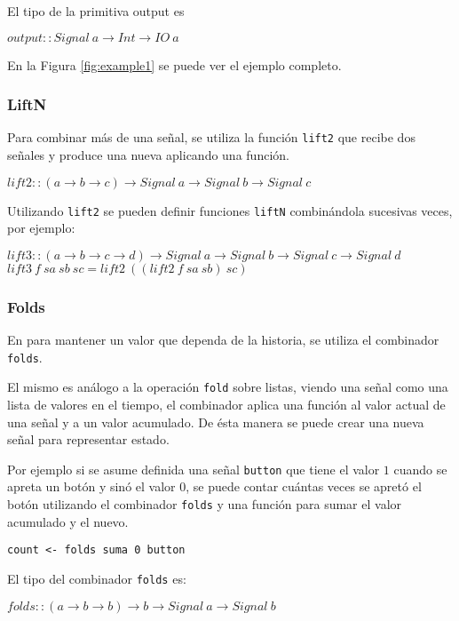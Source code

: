  El tipo de la primitiva output es

\begin{center}
$output :: Signal\ a \rightarrow Int \rightarrow IO\ a$
\end{center}
 
  En la Figura \ref{fig:example1} se puede ver el ejemplo completo.



\subsubsection{LiftN}

  Para combinar más de una señal, se utiliza la función \texttt{lift2}
que recibe dos señales y produce una nueva aplicando una función.

\begin{center}
$lift2 :: (a \rightarrow b \rightarrow c) \rightarrow Signal\ a \rightarrow Signal\ b \rightarrow Signal\ c$
\end{center}

  Utilizando \texttt{lift2} se pueden definir funciones \texttt{liftN}
combinándola sucesivas veces, por ejemplo:

\begin{center}
$lift3 :: (a \rightarrow b \rightarrow c \rightarrow d) \rightarrow Signal\ a \rightarrow Signal\ b \rightarrow Signal\ c \rightarrow Signal\ d$
$lift3\ f\ sa\ sb\ sc = lift2\ ((lift2\ f\ sa\ sb)\ sc)$
\end{center}

\subsubsection{Folds}

  En \frob{} para mantener un valor que dependa de la historia, se utiliza
el combinador \texttt{folds}.

  El mismo es análogo a la operación \texttt{fold} sobre listas, viendo
una señal como una lista de valores en el tiempo, el combinador aplica una
función al valor actual de una señal y a un valor acumulado.
  De ésta manera se puede crear una nueva señal para representar estado.

  Por ejemplo si se asume definida una señal \texttt{button} que tiene
el valor $1$ cuando se apreta un botón y sinó el valor $0$, se puede
contar cuántas veces se apretó el botón utilizando el combinador \texttt{folds}
y una función para sumar el valor acumulado y el nuevo.

\begin{center}
\begin{Verbatim}[frame=single]
count <- folds suma 0 button
\end{Verbatim}
\end{center}

El tipo del combinador \texttt{folds} es:

\begin{center}
$folds :: (a \rightarrow b \rightarrow b) \rightarrow b \rightarrow Signal\ a \rightarrow Signal\ b$
\end{center}


